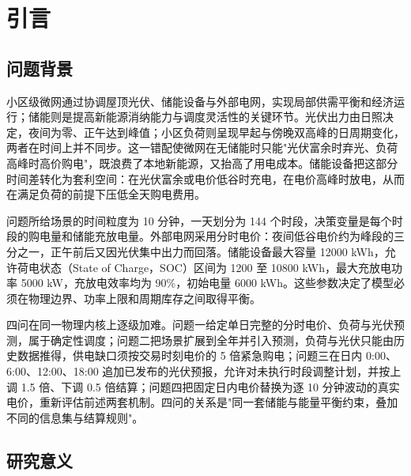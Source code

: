\documentclass[withoutpreface,bwprint]{cumcmthesis}
\begin{document}











\vspace{-1.4cm} 
\section{引言}
\subsection{问题背景}

小区级微网通过协调屋顶光伏、储能设备与外部电网，实现局部供需平衡和经济运行；储能则是提高新能源消纳能力与调度灵活性的关键环节\cite{olivares2014microgrid}。光伏出力由日照决定，夜间为零、正午达到峰值；小区负荷则呈现早起与傍晚双高峰的日周期变化，两者在时间上并不同步。这一错配使微网在无储能时只能"光伏富余时弃光、负荷高峰时高价购电"，既浪费了本地新能源，又抬高了用电成本。储能设备把这部分时间差转化为套利空间：在光伏富余或电价低谷时充电，在电价高峰时放电，从而在满足负荷的前提下压低全天购电费用。

问题所给场景的时间粒度为 10 分钟，一天划分为 144 个时段，决策变量是每个时段的购电量和储能充放电量。外部电网采用分时电价：夜间低谷电价约为峰段的三分之一，正午前后又因光伏集中出力而回落。储能设备最大容量 12000 kWh，允许荷电状态（State of Charge，SOC）区间为 1200 至 10800 kWh，最大充放电功率 5000 kW，充放电效率均为 90\%，初始电量 6000 kWh。这些参数决定了模型必须在物理边界、功率上限和周期库存之间取得平衡。

四问在同一物理内核上逐级加难。问题一给定单日完整的分时电价、负荷与光伏预测，属于确定性调度；问题二把场景扩展到全年并引入预测，负荷与光伏只能由历史数据推得，供电缺口须按交易时刻电价的 5 倍紧急购电；问题三在日内 0:00、6:00、12:00、18:00 追加已发布的光伏预报，允许对未执行时段调整计划，并按上调 1.5 倍、下调 0.5 倍结算；问题四把固定日内电价替换为逐 10 分钟波动的真实电价，重新评估前述两套机制。四问的关系是"同一套储能与能量平衡约束，叠加不同的信息集与结算规则"。

\subsection{研究意义}
\end{document}
